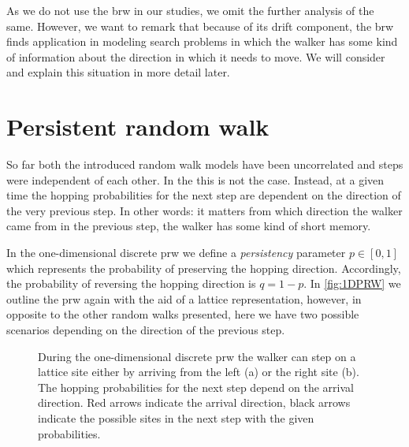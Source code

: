 As we do not use the \ac{brw} in our studies, we omit the further analysis of the same. However,  we want to remark that because of its drift component, the \ac{brw} finds application in modeling search problems in which the walker has some kind of information about the direction in which it needs to move. We will consider and explain this situation in more detail later.

\section{Persistent random walk}
So far both the introduced random walk models have been uncorrelated and steps were independent of each other. In the  this is not the case. Instead, at a given time the hopping probabilities for the next step are dependent on the direction of the very previous step. In other words: it matters from which direction the walker came from in the previous step, \ie the walker has some kind of short memory.

In the one-dimensional discrete \ac{prw} we define a \textit{persistency} parameter $p \in [0,1]$ which represents the probability of preserving the hopping direction. Accordingly, the probability of reversing the hopping direction is $q = 1 - p$. In \autoref{fig:1DPRW} we outline the \ac{prw} again with the aid of a lattice representation, however, in opposite to the other random walks presented, here we have two possible scenarios depending on the direction of the previous step.

\begin{figure}[bth]
    \myfloatalign
     \quad
    \caption[\acl{prw} on a one-dimensional lattice]{During the one-dimensional discrete \ac{prw} the walker can step on a lattice site either by arriving from the left (a) or the right site (b). The hopping probabilities for the next step depend on the arrival direction. Red arrows indicate the arrival direction, black arrows indicate the possible sites in the next step with the given probabilities.}\label{fig:1DPRW}
\end{figure}

